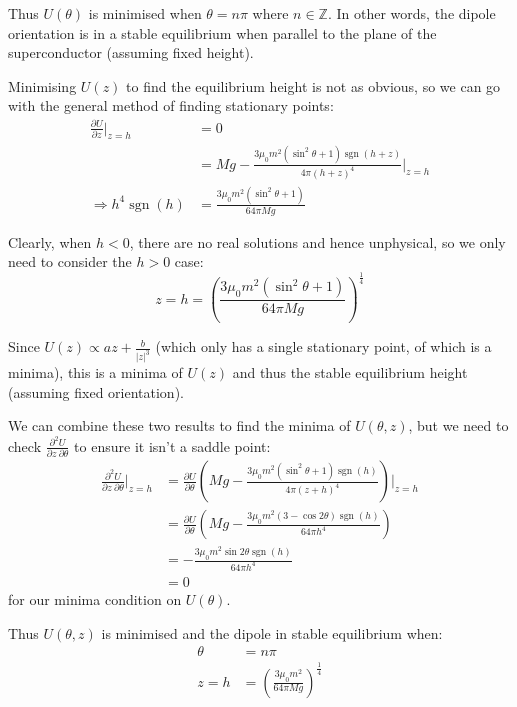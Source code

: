 \documentclass[a4paper]{scrartcl}
\begin{document}
Thus \(U(\theta)\) is minimised when \(\theta = n \pi\) where \(n \in \mathbb{Z}\). In other words, the dipole orientation is in a stable equilibrium when parallel to the plane of the superconductor (assuming fixed height).

Minimising \(U(z)\) to find the equilibrium height is not as obvious, so we can go with the general method of finding stationary points:
\begin{align*}
    \frac{\partial U}{\partial z} \bigg|_{z = h} &= 0 \\
    &= M g - \frac{3 \mu_0 m^2 (\sin^2 \theta + 1) \operatorname{sgn}(h + z)}{4 \pi (h + z)^4} \bigg|_{z = h} \\
    \Rightarrow h^4 \operatorname{sgn}(h) &= \frac{3 \mu_0 m^2 (\sin^2 \theta + 1)}{64 \pi M g}
\end{align*}

Clearly, when \(h < 0\), there are no real solutions and hence unphysical, so we only need to consider the \(h > 0\) case:
\[z = h = \left(\frac{3 \mu_0 m^2 (\sin^2 \theta + 1)}{64 \pi M g}\right)^\frac{1}{4}\]

Since \(U(z) \propto a z + \frac{b}{|z|^3}\) (which only has a single stationary point, of which is a minima), this is a minima of \(U(z)\) and thus the stable equilibrium height (assuming fixed orientation).

We can combine these two results to find the minima of \(U(\theta, z)\), but we need to check \(\frac{\partial^2 U}{\partial z \:\partial \theta}\) to ensure it isn't a saddle point:
\begin{align*}
    \frac{\partial^2 U}{\partial z \:\partial \theta} \bigg|_{z = h} &= \frac{\partial U}{\partial \theta} \left(M g - \frac{3 \mu_0 m^2 (\sin^2 \theta + 1) \operatorname{sgn}(h)}{4 \pi (z + h)^4}\right) \bigg|_{z = h} \\
     &= \frac{\partial U}{\partial \theta} \left(M g - \frac{3 \mu_0 m^2 (3 - \cos 2 \theta) \operatorname{sgn}(h)}{64 \pi h^4}\right) \\
     &= -\frac{3 \mu_0 m^2 \sin 2 \theta \operatorname{sgn}(h)}{64 \pi h^4} \\
     &= 0
\end{align*}
for our minima condition on \(U(\theta)\).

Thus \(U(\theta, z)\) is minimised and the dipole in stable equilibrium when:
\begin{align*}
    \theta &= n \pi \\
    z = h &= \left(\frac{3 \mu_0 m^2}{64 \pi M g}\right)^\frac{1}{4}
\end{align*}
\end{document}
